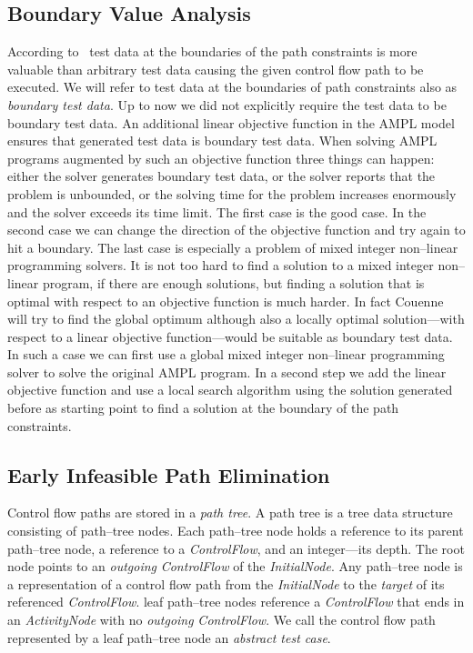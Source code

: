 \documentclass[runningheads,a4paper]{llncs}%
\newcommand{\UMLType}[1]{\textsf{\textit{#1}}} %
\newcommand{\UMLReference}[1]{\textsf{\textit{#1}}} %
\begin{document}
\subsection{Boundary Value Analysis}%
\label{sec:BoundaryValueAnalysis}%
According to~\cite{BoundaryValueTestingIsGood} test data at the boundaries of
the path constraints is more valuable than arbitrary test data causing the given
control flow path to be executed. We will refer to test data at the boundaries
of path constraints also as \emph{boundary test data}. Up to now we did not
explicitly require the test data to be boundary test data. An additional linear
objective function in the AMPL model ensures that generated test data is
boundary test data. When solving AMPL programs augmented by such an objective
function three things can happen: either the solver generates boundary test
data, or the solver reports that the problem is unbounded, or the solving time
for the problem increases enormously and the solver exceeds its time limit.
The first case is the good case. In the second case we can change the direction
of the objective function and try again to hit a boundary. The last case is
especially a problem of mixed integer non--linear programming solvers. It is not
too hard to find a solution to a mixed integer non--linear program, if there are
enough solutions, but finding a solution that is optimal with respect to an
objective function is much harder. In fact Couenne will try to find the global
optimum although also a locally optimal solution---with respect to a linear
objective function---would be suitable as boundary test data. In such a case we
can first use a global mixed integer non--linear programming solver to solve the
original AMPL program. In a second step we add the linear objective function and
use a local search algorithm using the solution generated before as starting
point to find a solution at the boundary of the path constraints.
%
\subsection{Early Infeasible Path Elimination}%
\label{sec:InfeasiblePathElimination}%
Control flow paths are stored in a \emph{path tree}. A path tree is a tree data
structure consisting of path--tree nodes. Each path--tree node holds a reference
to its parent path--tree node, a reference to a \UMLType{ControlFlow}, and an
integer---its depth. The root node points to an \UMLReference{outgoing}
\UMLType{ControlFlow} of the \UMLType{InitialNode}. Any path--tree node is a
representation of a control flow path from the \UMLType{InitialNode} to the
\UMLReference{target} of its referenced \UMLType{ControlFlow}. leaf path--tree
nodes reference a \UMLType{ControlFlow} that ends in an \UMLType{ActivityNode}
with no \UMLReference{outgoing} \UMLType{ControlFlow}. We call the control flow
path represented by a leaf path--tree node an \emph{abstract test case}.
\end{document}
